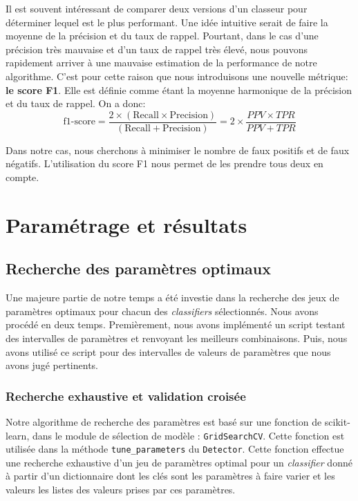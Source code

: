 \documentclass[a4paper]{report}
\begin{document}
Il est souvent intéressant de comparer deux versions d'un classeur pour déterminer lequel est le plus performant. Une idée intuitive serait de faire la moyenne de la précision et du taux de rappel. Pourtant, dans le cas d'une précision très mauvaise et d'un taux de rappel très élevé, nous pouvons rapidement arriver à une mauvaise estimation de la performance de notre algorithme. C'est pour cette raison que nous introduisons une nouvelle métrique: \textbf{le score F1}. Elle est définie comme étant la moyenne harmonique de la précision et du taux de rappel. On a donc:
\begin{equation}
	\text{f1-score} = \dfrac{2\times(\text{Recall} \times \text{Precision})}{(\text{Recall} + \text{Precision})} = 2\times\dfrac{PPV \times TPR}{PPV + TPR}
\end{equation}

Dans notre cas, nous cherchons à minimiser le nombre de faux positifs et de faux négatifs. L'utilisation du score F1 nous permet de les prendre tous deux en compte.

\chapter{Paramétrage et résultats}

\section{Recherche des paramètres optimaux}

Une majeure partie de notre temps a été investie dans la recherche des jeux de paramètres optimaux pour chacun des \emph{classifiers} sélectionnés. Nous avons procédé en deux temps. Premièrement, nous avons implémenté un script testant des intervalles de paramètres et renvoyant les meilleurs combinaisons. Puis, nous avons utilisé ce script pour des intervalles de valeurs de paramètres que nous avons jugé pertinents.

\subsection{Recherche exhaustive et validation croisée}

Notre algorithme de recherche des paramètres est basé sur une fonction de scikit-learn, dans le module de sélection de modèle : \texttt{GridSearchCV}. Cette fonction est utilisée dans la méthode \texttt{tune\_parameters} du \texttt{Detector}. Cette fonction effectue une recherche exhaustive d'un jeu de paramètres optimal pour un \emph{classifier} donné à partir d'un dictionnaire dont les clés sont les paramètres à faire varier et les valeurs les listes des valeurs prises par ces paramètres.
\end{document}
